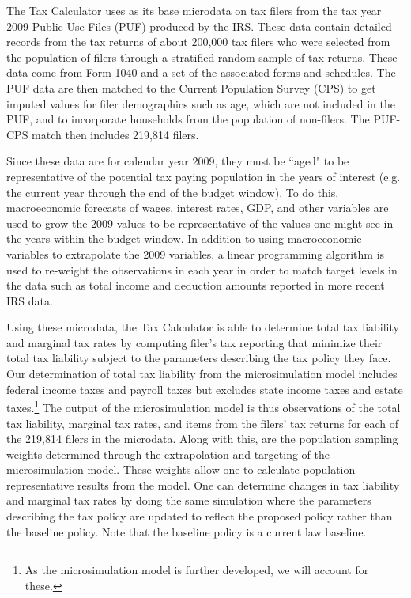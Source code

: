 \documentclass[letterpaper,12pt]{article}
\theoremstyle{definition}
\begin{document}
\begin{spacing}{1.5}
  The Tax Calculator uses as its base microdata on tax filers from the tax year 2009 Public Use Files (PUF) produced by the IRS. These data contain detailed records from the tax returns of about 200,000 tax filers who were selected from the population of filers through a stratified random sample of tax returns. These data come from Form 1040 and a set of the associated forms and schedules. The PUF data are then matched to the Current Population Survey (CPS) to get imputed values for filer demographics such as age, which are not included in the PUF, and to incorporate households from the population of non-filers. The PUF-CPS match then includes 219,814 filers.

  Since these data are for calendar year 2009, they must be ``aged" to be representative of the potential tax paying population in the years of interest (e.g. the current year through the end of the budget window).  To do this, macroeconomic forecasts of wages, interest rates, GDP, and other variables are used to grow the 2009 values to be representative of the values one might see in the years within the budget window.  In addition to using macroeconomic variables to extrapolate the 2009 variables, a linear programming algorithm is used to re-weight the observations in each year in order to match target levels in the data such as total income and deduction amounts reported in more recent IRS data.

  Using these microdata, the Tax Calculator is able to determine total tax liability and marginal tax rates by computing filer's tax reporting that minimize their total tax liability subject to the parameters describing the tax policy they face. Our determination of total tax liability from the microsimulation model includes federal income taxes and payroll taxes but excludes state income taxes and estate taxes.\footnote{As the microsimulation model is further developed, we will account for these.} The output of the microsimulation model is thus observations of the total tax liability, marginal tax rates, and items from the filers' tax returns for each of the 219,814 filers in the microdata. Along with this, are the population sampling weights determined through the extrapolation and targeting of the microsimulation model. These weights allow one to calculate population representative results from the model. One can determine changes in tax liability and marginal tax rates by doing the same simulation where the parameters describing the tax policy are updated to reflect the proposed policy rather than the baseline policy. Note that the baseline policy is a current law baseline.  



\end{spacing}
\end{document}
